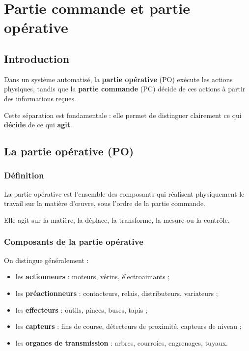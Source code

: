 \section{Partie commande et partie opérative}

\subsection{Introduction}

Dans un système automatisé, la \textbf{partie opérative} (PO) exécute les actions physiques, tandis que la \textbf{partie commande} (PC) décide de ces actions à partir des informations reçues.

Cette séparation est fondamentale : elle permet de distinguer clairement ce qui \textbf{décide} de ce qui \textbf{agit}.

\subsection{La partie opérative (PO)}

\subsubsection{Définition}

La partie opérative est l'ensemble des composants qui réalisent physiquement le travail sur la matière d'œuvre, sous l'ordre de la partie commande.

Elle agit sur la matière, la déplace, la transforme, la mesure ou la contrôle.

\subsubsection{Composants de la partie opérative}

On distingue généralement :

\begin{itemize}
    \item les \textbf{actionneurs} : moteurs, vérins, électroaimants ;
    \item les \textbf{préactionneurs} : contacteurs, relais, distributeurs, variateurs ;
    \item les \textbf{effecteurs} : outils, pinces, buses, tapis ;
    \item les \textbf{capteurs} : fins de course, détecteurs de proximité, capteurs de niveau ;
    \item les \textbf{organes de transmission} : arbres, courroies, engrenages, tuyaux.
\end{itemize}

